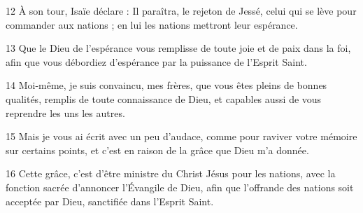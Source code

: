 
12 À son tour, Isaïe déclare : Il paraîtra, le rejeton de Jessé, celui qui se lève pour commander aux nations ; en lui les nations mettront leur espérance.

13 Que le Dieu de l’espérance vous remplisse de toute joie et de paix dans la foi, afin que vous débordiez d’espérance par la puissance de l’Esprit Saint.

14 Moi-même, je suis convaincu, mes frères, que vous êtes pleins de bonnes qualités, remplis de toute connaissance de Dieu, et capables aussi de vous reprendre les uns les autres.

15 Mais je vous ai écrit avec un peu d’audace, comme pour raviver votre mémoire sur certains points, et c’est en raison de la grâce que Dieu m’a donnée.

16 Cette grâce, c’est d’être ministre du Christ Jésus pour les nations, avec la fonction sacrée d’annoncer l’Évangile de Dieu, afin que l’offrande des nations soit acceptée par Dieu, sanctifiée dans l’Esprit Saint.